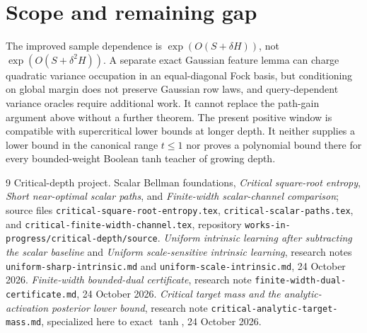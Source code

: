 \documentclass[11pt]{article}
\begin{document}
\section{Scope and remaining gap}
The improved sample dependence is $\exp(O(S+\delta H))$, not
$\exp(O(S+\delta^2H))$. A separate exact Gaussian feature lemma can
charge quadratic variance occupation in an equal-diagonal Fock basis,
but conditioning on global margin does not preserve Gaussian row laws,
and query-dependent variance oracles require additional work. It
cannot replace the path-gain argument above without a further theorem.
The present positive window is compatible with supercritical lower
bounds at longer depth. It neither supplies a lower bound in the
canonical range $t\le1$ nor proves a polynomial bound there for every
bounded-weight Boolean tanh teacher of growing depth.

{\small\raggedright
\begin{thebibliography}{9}
 Critical-depth project. Scalar Bellman foundations,
\emph{Critical square-root entropy}, \emph{Short near-optimal scalar
paths}, and \emph{Finite-width scalar-channel comparison}; source files
\texttt{critical-square-root-entropy.tex},
\texttt{critical-scalar-paths.tex}, and
\texttt{critical-finite-width-channel.tex}, repository
\texttt{works-in-progress/critical-depth/source}.
 \emph{Uniform intrinsic learning after subtracting
the scalar baseline} and \emph{Uniform scale-sensitive intrinsic
learning}, research notes \texttt{uniform-sharp-intrinsic.md} and
\texttt{uniform-scale-intrinsic.md}, 24 October 2026.
 \emph{Finite-width bounded-dual certificate},
research note \texttt{finite-width-dual-certificate.md}, 24 October 2026.
 \emph{Critical target mass and the analytic-activation
posterior lower bound}, research note
\texttt{critical-analytic-target-mass.md}, specialized here to exact
$\tanh$, 24 October 2026.
\end{thebibliography}
}
\end{document}
